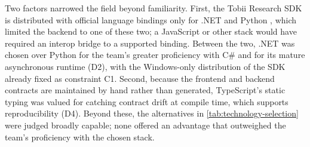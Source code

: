Two factors narrowed the field beyond familiarity.
First, the Tobii Research SDK is distributed with official language bindings only for .NET and Python \cite{tobii2025fusion}, which limited the backend to one of these two; a JavaScript or other stack would have required an interop bridge to a supported binding.
Between the two, .NET was chosen over Python for the team's greater proficiency with C\# and for its mature asynchronous runtime (D2), with the Windows-only distribution of the SDK already fixed as constraint C1.
Second, because the frontend and backend contracts are maintained by hand rather than generated, TypeScript's static typing was valued for catching contract drift at compile time, which supports reproducibility (D4).
Beyond these, the alternatives in \cref{tab:technology-selection} were judged broadly capable; none offered an advantage that outweighed the team's proficiency with the chosen stack.
